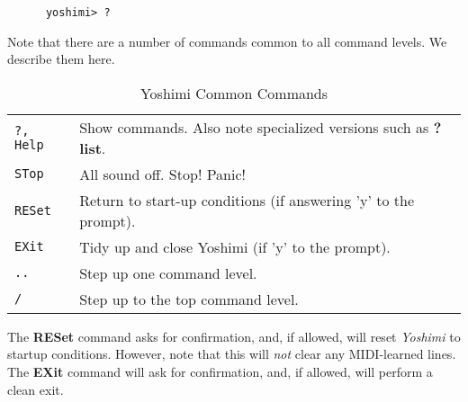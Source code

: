    \begin{verbatim}
      yoshimi> ?
   \end{verbatim}

   Note that there are a number of commands common to all command levels.
   We describe them here.

   \begin{table}[H]
      \centering
      \caption{Yoshimi Common Commands}
      \label{table:yoshimi_text_common_commands}
      \begin{tabular}{l l}

\texttt{?,  Help} &
   Show commands.  Also note specialized versions such as \textbf{? list}. \\
\texttt{STop} &
   All sound off.  Stop!  Panic! \\
\texttt{RESet} &
   Return to start-up conditions (if answering 'y' to the prompt). \\
\texttt{EXit} &
   Tidy up and close Yoshimi (if 'y' to the prompt). \\
\texttt{..} &
   Step up one command level. \\
\texttt{/} &
   Step up to the top command level. \\

      \end{tabular}
   \end{table}

   The \textbf{RESet} command asks for confirmation, and, if allowed, will
   reset \textsl{Yoshimi} to startup conditions.
   However, note that this will \textsl{not} clear any MIDI-learned lines.
   The \textbf{EXit} command will ask for confirmation, and, if allowed, will
   perform a clean exit.

